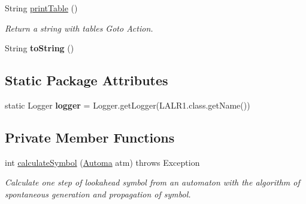 \begin{DoxyCompactItemize}
\item 
String \hyperlink{classcontext_free_1_1scanner_1_1_l_a_l_r1_a452dc07f015344b3681d8e1a161d51dd}{print\-Table} ()
\begin{DoxyCompactList}\small\item\em Return a string with tables Goto Action. \end{DoxyCompactList}\item 
\hypertarget{classcontext_free_1_1scanner_1_1_l_a_l_r1_abe84feb77fd24be7e65dbfd7e1103112}{String {\bfseries to\-String} ()}\label{classcontext_free_1_1scanner_1_1_l_a_l_r1_abe84feb77fd24be7e65dbfd7e1103112}

\end{DoxyCompactItemize}
\subsection*{Static Package Attributes}
\begin{DoxyCompactItemize}
\item 
\hypertarget{classcontext_free_1_1scanner_1_1_l_a_l_r1_a4eecab5f1245d08a45d71ba27f91350d}{static Logger {\bfseries logger} = Logger.\-get\-Logger(L\-A\-L\-R1.\-class.\-get\-Name())}\label{classcontext_free_1_1scanner_1_1_l_a_l_r1_a4eecab5f1245d08a45d71ba27f91350d}

\end{DoxyCompactItemize}
\subsection*{Private Member Functions}
\begin{DoxyCompactItemize}
\item 
int \hyperlink{classcontext_free_1_1scanner_1_1_l_a_l_r1_ab1c19e75693982310b7494bd3b8623c9}{calculate\-Symbol} (\hyperlink{classcontext_free_1_1scanner_1_1_automa}{Automa} atm)  throws Exception
\begin{DoxyCompactList}\small\item\em Calculate one step of lookahead symbol from an automaton with the algorithm of spontaneous generation and propagation of symbol. \end{DoxyCompactList}\end{DoxyCompactItemize}
